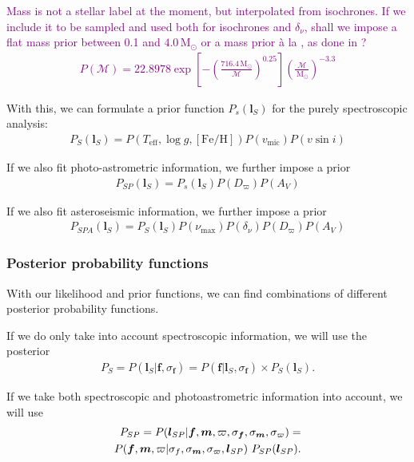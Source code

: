 \documentclass[
  journal=pasa,
  manuscript=research-paper, %
  year=2021,
  volume=37,
]{cup-journal}
\newcommand{\SB}[1]{{\textcolor{purple}{#1}}}
\newcommand{\Msol}{\,\mathrm{M_\odot}} %
\begin{document}
\SB{Mass is not a stellar label at the moment, but interpolated from isochrones. If we include it to be sampled and used both for isochrones and $\delta_\nu$, shall we impose a flat mass prior between 0.1 and $4.0\Msol$ or a mass prior à la \citet{Chabrier2001}, as done in \citet{Sharma2018}?
\begin{align} \label{eq:chabrier}
    P(\mathcal{M}) = 22.8978 \exp \left[ - \left(\frac{716.4\Msol}{\mathcal{M}}\right)^{0.25} \right] \left( \frac{\mathcal{M}}{\Msol} \right)^{-3.3}
\end{align}
}

With this, we can formulate a prior function $P_s (\boldsymbol{l}_S)$ for the purely spectroscopic analysis:
\begin{align}
    P_S ( \boldsymbol{l}_S ) = P(T_\text{eff}, \log g, \mathrm{[Fe/H]}) P(v_\text{mic}) P(v\sin i)
\end{align}

If we also fit photo-astrometric information, we further impose a prior
\begin{align}
    P_{SP} ( \boldsymbol{l}_S ) = P_s ( \boldsymbol{l}_S ) P(D_\varpi) P (A_V)
\end{align}

If we also fit asteroseismic information, we further impose a prior
\begin{align}
    P_{SPA} ( \boldsymbol{l}_S ) = P_S ( \boldsymbol{l}_S ) P(\nu_\text{max}) P(\delta_\nu) P(D_\varpi) P (A_V)
\end{align}

\subsubsection{Posterior probability functions} \label{subsubsec:probability}

With our likelihood and prior functions, we can find combinations of different posterior probability functions.

If we do only take into account spectroscopic information, we will use the posterior
\begin{align} \label{eq:posterior_s}
    P_S = P ( \boldsymbol{l}_S \vert {\boldsymbol{f}}, \sigma_{\boldsymbol{f}} ) = P ( {\boldsymbol{f}} \vert \boldsymbol{l}_S, \sigma_{\boldsymbol{f}} ) \times P_S ( \boldsymbol{l}_S ).
\end{align}

If we take both spectroscopic and photoastrometric information into account, we will use
\begin{align}\label{eq:posterior_sp}
    P_{SP} = P ( \boldsymbol{l}_{SP} \vert {\boldsymbol{f}}, {\boldsymbol{m}}, \varpi, \sigma_{\boldsymbol{f}} , \sigma_{\boldsymbol{m}}, \sigma_\varpi) = \notag\\
    P ( {\boldsymbol{f}}, {\boldsymbol{m}}, \varpi \vert \sigma_{f}, \sigma_{\boldsymbol{m}}, \sigma_\varpi, \boldsymbol{l}_{SP} ) ~ P_{SP} ( \boldsymbol{l}_{SP} ).
\end{align}
\end{document}

